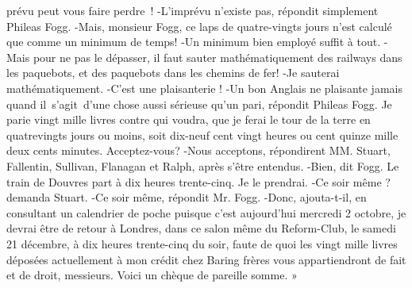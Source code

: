 \documentclass[]{book}
\begin{document}
                  
               prévu peut vous faire perdre !\newline
               -L'imprévu n'existe pas, répondit simplement Phileas Fogg.\newline
               -Mais, monsieur Fogg, ce laps de quatre-vingts jours n'est calculé que comme
               un minimum de temps!\newline
               -Un minimum bien employé suffit à 
               tout.\newline
               -Mais pour ne pas le dépasser, il faut
               sauter mathématiquement des railways 
               dans les paquebots, et des paquebots dans
               les chemins de fer!\newline
               -Je sauterai mathématiquement.\newline
               -C'est une plaisanterie !\newline
               -Un bon Anglais ne plaisante jamais
               quand il s’agit d'une chose aussi sérieuse
               qu'un pari, répondit Phileas Fogg. Je parie vingt mille livres contre qui voudra,
               que je ferai le tour de la terre en quatrevingts jours ou moins, soit dix-neuf cent 
               vingt heures ou cent quinze mille deux
               cents minutes. Acceptez-vous?\newline
               -Nous acceptons, répondirent MM. 
               Stuart, Fallentin, Sullivan, Flanagan et
               Ralph\newline, après s'être entendus.
               -Bien, dit Fogg. Le train de Douvres
               part à dix heures trente-cinq. Je le prendrai.\newline
               -Ce soir même ? demanda Stuart.\newline
               -Ce soir même, répondit Mr. Fogg. \newline
               -Donc, ajouta-t-il, en consultant un calendrier de poche puisque c'est aujourd'hui mercredi 2 octobre, je devrai être
               de retour à Londres, dans ce salon même 
               du Reform-Club, le samedi 21 décembre, à
               dix heures trente-cinq du soir, faute de
               quoi les vingt mille livres déposées actuellement à mon crédit chez Baring frères
               vous appartiendront de fait et de droit,
               messieurs. Voici un chèque de pareille 
               somme. »\newline
            
\end{document}

